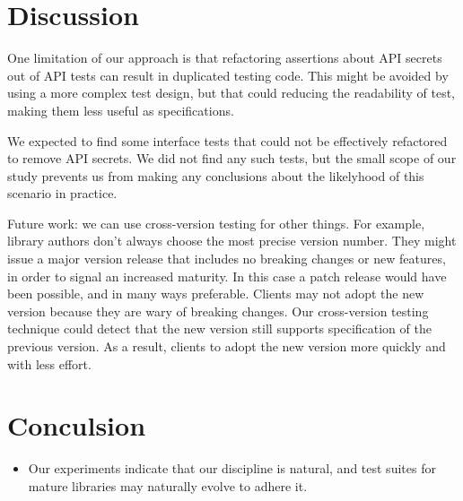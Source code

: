 \section{Discussion}
One limitation of our approach is that refactoring assertions about
API secrets out of API tests can result in duplicated testing
code. This might be avoided by using a more complex test design, but
that could reducing the readability of test, making them less useful
as specifications.

We expected to find some interface tests that could not be effectively
refactored to remove API secrets. We did not find any such tests, but
the small scope of our study prevents us from making any conclusions
about the likelyhood of this scenario in practice. 

Future work: we can use cross-version testing for other things. For
example, library authors don't always choose the most precise version
number. They might issue a major version release that includes no
breaking changes or new features, in order to signal an increased
maturity. In this case a patch release would have been possible, and
in many ways preferable. Clients may not adopt the new version because
they are wary of breaking changes. Our cross-version testing technique
could detect that the new version still supports specification of the
previous version. As a result, clients to adopt the new version more
quickly and with less effort.


\section{Conculsion} 

\begin{itemize}
\item Our experiments indicate that our discipline is natural, and
  test suites for mature libraries may naturally evolve to adhere it.
\end{itemize}
